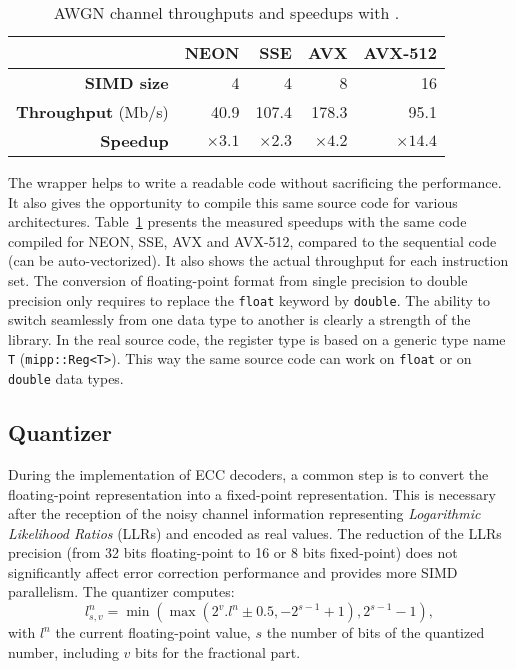 \begin{table}[htp]
  \centering
  \caption{AWGN channel throughputs and speedups with \MIPP.}
  \label{lst:opt_simu_awgn_speedup}
  \begin{tabular}{r | r  r r r}
                             & \textbf{NEON} & \textbf{SSE} & \textbf{AVX} & \textbf{AVX-512} \\ \hline \hline
  \textbf{SIMD size}         & 4             & 4            & 8            & 16               \\ %
  \textbf{Throughput} (Mb/s) & 40.9          & 107.4        & 178.3        & 95.1             \\ %
  \textbf{Speedup}           & $\times 3.1$  & $\times 2.3$ & $\times 4.2$ & $\times 14.4$    \\
  \end{tabular}
\end{table}

The \MIPP wrapper helps to write a readable code without sacrificing the
performance. It also gives the opportunity to compile this same source code for
various architectures. Table~\ref{lst:opt_simu_awgn_speedup} presents the
measured speedups with the same \MIPP code compiled for NEON, SSE, AVX and
AVX-512, compared to the sequential code (can be auto-vectorized). It also shows
the actual throughput for each instruction set. The conversion of floating-point
format from single precision to double precision only requires to replace the
\verb|float| keyword by \verb|double|. The ability to switch seamlessly from one
data type to another is clearly a strength of the \MIPP library. In the real
source code, the register type is based on a generic type name \verb|T|
(\verb|mipp::Reg<T>|). This way the same source code can work on \verb|float| or
on \verb|double| data types.

\subsection{Quantizer}
\label{sec:opt_simu_quantizer}

During the implementation of ECC decoders, a common step is to convert the
floating-point representation into a fixed-point representation. This is
necessary after the reception of the noisy channel information representing
\textit{Logarithmic Likelihood Ratios} (LLRs) and encoded as real values. The
reduction of the LLRs precision (from 32 bits floating-point to 16 or 8 bits
fixed-point) does not significantly affect error correction performance and
provides more SIMD parallelism. The quantizer computes:
\begin{equation*}
l_{s,v}^n = \min(\max(2^v . l^n \pm 0.5, -2^{s-1} +1), 2^{s-1} -1),
\end{equation*}
with $l^n$ the current floating-point value, $s$ the number of bits of the
quantized number, including $v$ bits for the fractional part.

